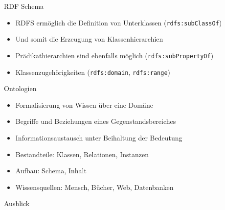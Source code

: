 \documentclass{beamer}
\begin{document}
\begin{frame}{RDF Schema}
	
	\begin{itemize}
		\item RDFS ermöglich die Definition von Unterklassen (\texttt{rdfs:subClassOf})
		\item Und somit die Erzeugung von Klassenhierarchien
		\item Prädikathierarchien sind ebenfalls möglich (\texttt{rdfs:subPropertyOf})
		\item Klassenzugehörigkeiten (\texttt{rdfs:domain}, \texttt{rdfs:range}) 
	\end{itemize}
	
\end{frame}

\begin{frame}{Ontologien}
	
	\begin{itemize}
		\item Formalisierung von Wissen über eine Domäne
		\item Begriffe und Beziehungen eines Gegenstandsbereiches
		\item Informationsaustausch unter Beihaltung der Bedeutung
		\item Bestandteile: Klassen, Relationen, Instanzen
		\item Aufbau: Schema, Inhalt
		\item Wissensquellen: Mensch, Bücher, Web, Datenbanken
	\end{itemize}
	
\end{frame}

\begin{frame}[plain]{}
	
	\huge
	\begin{center}
		Ausblick
	\end{center}
	
\end{frame}
\end{document}
